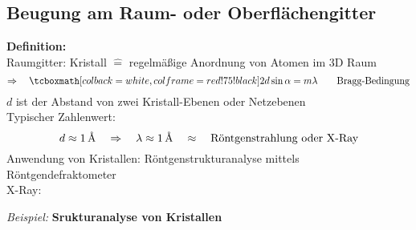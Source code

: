 \subsection{Beugung am Raum- oder Oberflächengitter}

\textbf{Definition:}\\
Raumgitter: Kristall $ \widehat{=} $ regelmäßige Anordnung von Atomen im 3D Raum\\
\begin{equation*}
\Rightarrow \quad \rmbox{2 d \sin \alpha = m \lambda} \qquad \tx{Bragg-Bedingung}
\end{equation*}
$ d $ ist der Abstand von zwei Kristall-Ebenen oder Netzebenen\\
\noindent
Typischer Zahlenwert:
\begin{equation*}
d \approx 1 \, \textrm{\AA} \quad \Rightarrow \quad \lambda \approx 1 \,  \textrm{\AA} \quad \approx \quad \textrm{Röntgenstrahlung oder X-Ray}
\end{equation*}
Anwendung von Kristallen: Röntgenstrukturanalyse mittels Röntgendefraktometer\\
X-Ray: 


\noindent
\emph{Beispiel:} \textbf{Srukturanalyse von Kristallen}

